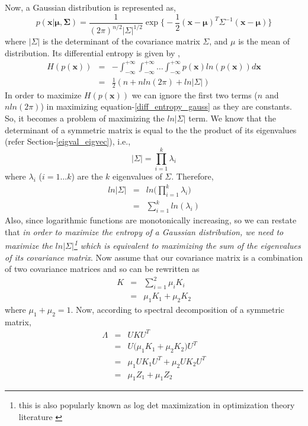 Now, a Gaussian distribution is represented as,
\begin{equation}
p(\mathbf{x|\mu,\Sigma})=\frac{1}{(2\pi)^{n/2}\lvert\Sigma\rvert^{1/2}}\exp \big\lbrace -\frac{1}{2}(\mathbf{x-\mu})^{T}\Sigma^{-1} (\mathbf{x-\mu}) \big \rbrace
\end{equation}
where $\lvert\Sigma\rvert$ is the determinant of the covariance matrix $\Sigma$, and $\mu$ is the mean of distribution. Its differential entropy is given by \citep{brookes2005matrix},
\begin{eqnarray}
H(p(\mathbf{x})) &=& -\int_{-\infty}^{+\infty} \int_{-\infty}^{+\infty} \dots \int_{-\infty}^{+\infty}p(\mathbf{x})ln (p(\mathbf{x})) d\mathbf{x} \\
&=& \frac{1}{2}(n+n ln(2\pi)+ln|\Sigma|) \label{diff_entropy_gauss}
\end{eqnarray}
In order to maximize $H(p(\mathbf{x}))$ we can ignore the first two terms ($n$ and $n ln(2\pi)$) in maximizing equation-\ref{diff_entropy_gauss} as they are constants. So, it becomes a problem of maximizing the $ln|\Sigma|$ term. We know that the determinant of a symmetric matrix is equal to the the product of its eigenvalues (refer Section-\ref{eigval_eigvec}), i.e.,
\[
|\Sigma|=\prod_{i=1}^{k}\lambda_{i}
\]
where $\lambda_{i}$ ($i=1\dots k$) are the $k$ eigenvalues of $\Sigma$. Therefore,
\begin{eqnarray}
ln|\Sigma|&=& ln\big (\prod_{i=1}^{k}\lambda_{i} \big) \\
&=& \sum_{i=1}^{k} ln (\lambda_{i}) \label{max_det}
\end{eqnarray}
Also, since logarithmic functions are monotonically increasing, so we can restate that \textit{in order to maximize the entropy of a Gaussian distribution, we need to maximize the $ln|\Sigma|$\footnote{this is also popularly known as log det maximization in optimization theory literature \citep{boyd2004convexopt}} which is equivalent to maximizing the sum of the eigenvalues of its covariance matrix}. Now assume that our covariance matrix is a combination of two covariance matrices and so can be rewritten as
\begin{eqnarray}
K &=& \sum_{i=1}^{2}\mu_{i}K_{i} \\
&=& \mu_{1}K_{1}+\mu_{2}K_{2}
\end{eqnarray}
where $\mu_{1}+\mu_{2}=1$. Now, according to spectral decomposition of a symmetric matrix,
\begin{eqnarray}
\Lambda &=& UKU^{T} \\ 
&=& U\big (\mu_{1}K_{1}+\mu_{2}K_{2} \big )U^{T} \\
&=& \mu_{1}UK_{1}U^{T}+\mu_{2}UK_{2}U^{T}  \\
&=& \mu_{1}Z_{1}+ \mu_{1}Z_{2} \label{eigv_split_1} 
\end{eqnarray}
